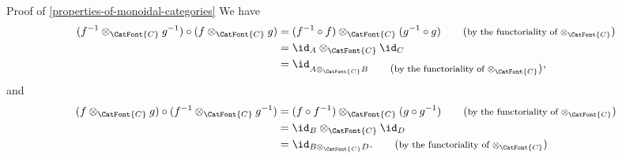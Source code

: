 \begin{Proof}{Proof of \cref{properties-of-monoidal-categories}}
    We have%
    \begin{align*}
        (f^{-1}\otimes_{\CatFont{C}}g^{-1})\circ(f\otimes_{\CatFont{C}}g) &= (f^{-1}\circ f)\otimes_{\CatFont{C}}(g^{-1}\circ g)\tag{\footnotesize by the functoriality of $\otimes_{\CatFont{C}}$\normalsize}\\
                                                                          &= \id_{A}\otimes_{\CatFont{C}}\id_{C}\\
                                                                          &= \id_{A\otimes_{\CatFont{C}}B\tag{\footnotesize by the functoriality of $\otimes_{\CatFont{C}}$\normalsize}},
    \end{align*}
    and
    \begin{align*}
        (f\otimes_{\CatFont{C}}g)\circ(f^{-1}\otimes_{\CatFont{C}}g^{-1}) &= (f\circ f^{-1})\otimes_{\CatFont{C}}(g\circ g^{-1})\tag{\footnotesize by the functoriality of $\otimes_{\CatFont{C}}$\normalsize}\\
                                                                          &= \id_{B}\otimes_{\CatFont{C}}\id_{D}\\
                                                                          &= \id_{B\otimes_{\CatFont{C}}D}.\tag{\footnotesize by the functoriality of $\otimes_{\CatFont{C}}$\normalsize}%
    \end{align*}


\end{Proof}
